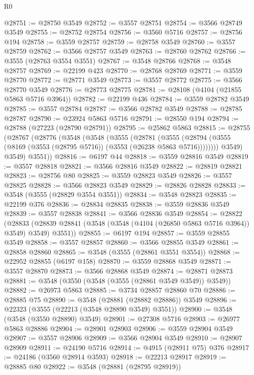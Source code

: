 \begin{lexlean}{R0}
\begin{coremodule}
@28751 := @28750 @3549
@28752 := @3557 @28751
@28754 := @3566 @28749 @3549
@28755 := @28752 @28754
@28756 := @3560 @5716
@28757 := @28756 @194
@28758 := @3559 @28757
@28759 := @28758 @3549
@28760 := @3557 @28759
@28762 := @3566 @28757 @3549
@28763 := @28760 @28762
@28766 := @3555 (@28763 @3554 @3551)
@28767 := @3548 @28766
@28768 := @3548 @28757
@28769 := @22199 @423
@28770 := @28768 @28769
@28771 := @3559 @28770
@28772 := @28771 @3549
@28773 := @3557 @28772
@28775 := @3566 @28770 @3549
@28776 := @28773 @28775
@28781 := @28108 (@4104 (@21855 @5863 @5716 @3964))
@28782 := @22199 @436
@28784 := @3559 @28782 @3549
@28785 := @3557 @28784
@28787 := @3566 @28782 @3549
@28788 := @28785 @28787
@28790 := @23924 @5863 @5716
@28791 := @28550 @194
@28794 := @28788 (@27223 (@28790 @28791))
@28795 := @25862 @5863
@28815 := @28755
    (@28767
      (@28776
        (@3548
          (@3548
            (@3555
              (@28781
                (@3555
                  (@28794 (@3555 (@8169 (@3553 (@28795 @5716)) (@3553 (@26238 @5863 @5716))))))))
            @3549)
          @3549)
        @3551))
@28816 := @6197 @44
@28818 := @3559 @28816 @3549
@28819 := @3557 @28818
@28821 := @3566 @28816 @3549
@28822 := @28819 @28821
@28823 := @28756 @80
@28825 := @3559 @28823 @3549
@28826 := @3557 @28825
@28828 := @3566 @28823 @3549
@28829 := @28826 @28828
@28833 := @3548 (@3555 (@28829 @3554 @3551))
@28834 := @3548 @28823
@28835 := @22199 @376
@28836 := @28834 @28835
@28838 := @3559 @28836 @3549
@28839 := @3557 @28838
@28841 := @3566 @28836 @3549
@28854 := @28822
    (@28833 (@28839 @28841 (@3548 (@3548 (@4104 (@26850 @5863 @5716 @3964)) @3549) @3549) @3551))
@28855 := @6197 @194
@28857 := @3559 @28855 @3549
@28858 := @3557 @28857
@28860 := @3566 @28855 @3549
@28861 := @28858 @28860
@28865 := @3548 (@3555 (@28861 @3551 @3554))
@28868 := @22952 @28855 (@6197 @158)
@28870 := @3559 @28868 @3549
@28871 := @3557 @28870
@28873 := @3566 @28868 @3549
@28874 := @28871 @28873
@28881 := @3548 (@3550 (@3548 (@3555 (@28861 @3549 @3549)) @3549))
@28882 := @26973 @5863
@28885 := @3734 @28857 @28860 @70
@28886 := @28885 @75
@28890 := @3548 (@28881 (@28882 @28886)) @3549
@28896 := @22323 (@3555 (@22213 (@3548 @28890 @3549) @3551))
@28900 := @3548 (@3548 (@3550 @28890) @3549)
@28901 := @27308 @5716
@28903 := @26977 @5863 @28886
@28904 := @28901 @28903
@28906 := @3559 @28904 @3549
@28907 := @3557 @28906
@28909 := @3566 @28904 @3549
@28910 := @28907 @28909
@28911 := @24190 @5716
@28914 := @4915 (@28911 @75) @376
@28917 := @24186 (@3560 @28914 @3593)
@28918 := @22213 @28917
@28919 := @28885 @80
@28922 := @3548 (@28881 (@28795 @28919))

\end{coremodule}
\end{lexlean}
